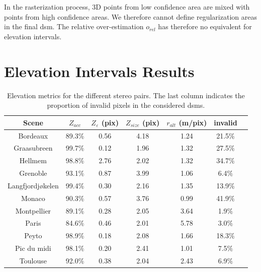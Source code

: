 \begin{remark}

    In the rasterization process, 3D points from low confidence area are mixed with points from high confidence areas. We therefore cannot define regularization areas in the final \acrshort{dsm}. The relative over-estimation $o_{rel}$ has therefore no equivalent for elevation intervals.  
\end{remark}

\section{Elevation Intervals Results}\label{sec:results_elevation}
\begin{table}[ht]
    \centering
    \begin{tabular}{|c||c|c|c|c|c|c|}
        \hline
        Scene & $Z_{acc}$ & $Z_\varepsilon$ (pix) & $Z_{size}$ (pix) & $r_{alt}$ (m/pix) & invalid
        \\\hline\hline
        Bordeaux & 89.3$\%$ & 0.56 & 4.18 & 1.24  & 21.5$\%$\\\hline
        Graasubreen & 99.7$\%$ & 0.12 & 1.96 & 1.32  & 27.5$\%$\\\hline
        Hellmem & 98.8$\%$ & 2.76 & 2.02 & 1.32  & 34.7$\%$\\\hline
        Grenoble & 93.1$\%$ & 0.87 & 3.99 & 1.06  & 6.4$\%$\\\hline
        Langfjordjøkelen & 99.4$\%$ & 0.30 & 2.16 & 1.35  & 13.9$\%$\\\hline
        Monaco & 90.3$\%$ & 0.57 & 3.76 & 0.99  & 41.9$\%$\\\hline
        Montpellier & 89.1$\%$ & 0.28 & 2.05 & 3.64  & 1.9$\%$\\\hline
        Paris & 84.6$\%$ & 0.46 & 2.01 & 5.78  & 3.0$\%$\\\hline
        Peyto & 98.9$\%$ & 0.18 & 2.08 & 1.66  & 18.3$\%$\\\hline
        Pic du midi & 98.1$\%$ & 0.20 & 2.41 & 1.01  & 7.5$\%$\\\hline
        Toulouse & 92.0$\%$ & 0.38 & 2.04 & 2.43  & 6.9$\%$\\\hline
    \end{tabular}
    \caption{Elevation metrics for the different stereo pairs. The last column indicates the proportion of invalid pixels in the considered \acrshort{dsm}s.}
    \label{tab:elevation_metrics_global}
\end{table}

